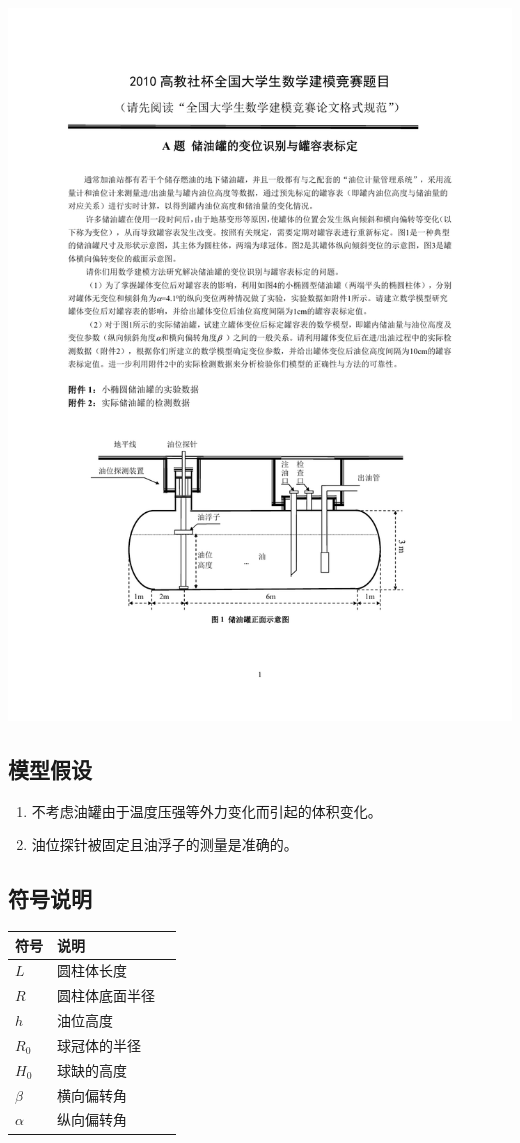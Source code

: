 \begin{center}
\includegraphics[page=2,scale=0.7]{Figures/2010A}
\end{center}
\subsection{模型假设}
\begin{enumerate}
\item 不考虑油罐由于温度压强等外力变化而引起的体积变化。
\item 油位探针被固定且油浮子的测量是准确的。
\end{enumerate}
\subsection{符号说明}
\begin{table}[htbp]
\begin{tabular}{@{}lll@{}}
\toprule
符号 & 说明 &  \\ \midrule
$L$ & 圆柱体长度 &  \\
$R$ & 圆柱体底面半径 &  \\
$h$ & 油位高度 &  \\
$R_0$ & 球冠体的半径 &  \\
$H_0$ & 球缺的高度 &  \\
$\beta$ & 横向偏转角 &  \\
$\alpha$ & 纵向偏转角 &  \\ \bottomrule
\end{tabular}
\end{table}
